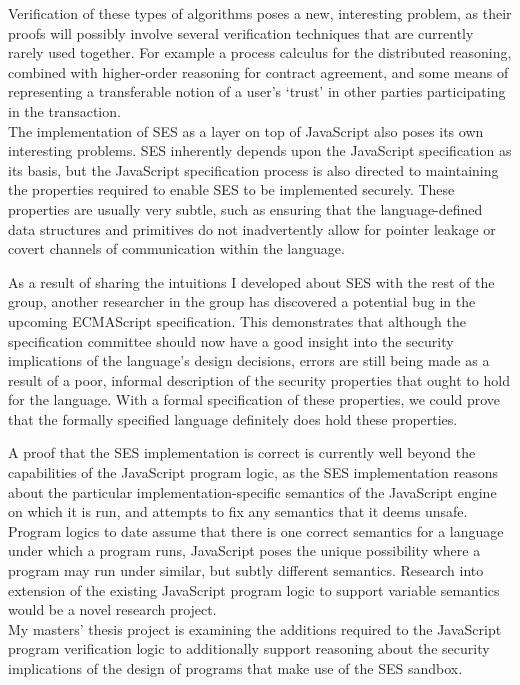 \documentclass[a4paper]{article}
\begin{document}
Verification of these types of algorithms poses a new, interesting problem, as
their proofs will possibly involve several verification techniques that are
currently rarely used together. For example a process calculus for the
distributed reasoning, combined with higher-order reasoning for contract
agreement, and some means of representing a transferable notion of a user's
`trust' in other parties participating in the transaction.
\\

The implementation of SES as a layer on top of JavaScript also poses its own
interesting problems. SES inherently depends upon the JavaScript specification
as its basis, but the JavaScript specification process is also directed to
maintaining the properties required to enable SES to be implemented securely.
These properties are usually very subtle, such as ensuring that the
language-defined data structures and primitives do not inadvertently allow for
pointer leakage or covert channels of communication within the language.

As a result of sharing the intuitions I developed about SES with the rest of the
group, another researcher in the group has discovered a potential bug in the
upcoming ECMAScript specification. This demonstrates that although the
specification committee should now have a good insight into the security
implications of the language's design decisions, errors are still being made as
a result of a poor, informal description of the security properties that ought
to hold for the language. With a formal specification of these properties, we
could prove that the formally specified language definitely does hold these
properties.

A proof that the SES implementation is correct is currently well beyond the
capabilities of the JavaScript program logic, as the SES implementation reasons
about the particular implementation-specific semantics of the JavaScript engine
on which it is run, and attempts to fix any semantics that it deems unsafe.
Program logics to date assume that there is one correct semantics for a language
under which a program runs, JavaScript poses the unique possibility where a
program may run under similar, but subtly different semantics. Research into
extension of the existing JavaScript program logic to support variable semantics
would be a novel research project.
\\

My masters' thesis project is examining the additions required to the JavaScript
program verification logic to additionally support reasoning about the security
implications of the design of programs that make use of the SES sandbox.
\end{document}
